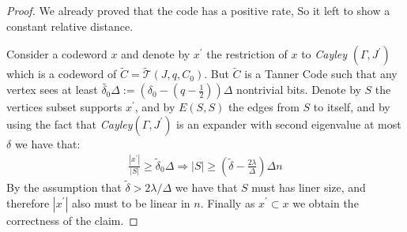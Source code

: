 \begin{proof} We already proved that the code has a positive rate, So it left to show a constant relative distance. 

  Consider a codeword $x$ and denote by $x^{\prime}$ the restriction of $x$ to \emph{Cayley }$\left( \Gamma, J^{\prime}  \right)$ which is a codeword of $\tilde{C} = \tilde{\mathcal{T}}\left(J, q ,C_{0}\right)$. But $\tilde{C}$ is a Tanner Code such that any vertex sees at least $ \tilde{\delta_{0}} \Delta := \left(\delta_{0} - \left( q - \frac{1}{2}   \right) \right)\Delta $ nontrivial bits.
  Denote by $S$ the vertices subset supports $x^{\prime}$, and by $E\left( S,S \right)$ the edges from $S$ to itself, and by using the fact that \emph{Cayley}$\left( \Gamma, J^{\prime} \right)$ is an expander with second eigenvalue at most $\delta$ we have that: 
  \begin{equation*}
    \begin{split}
      \frac{|x^{\prime}|}{|S|} \ge \tilde{\delta}_{0}\Delta \Rightarrow  |S| \ge \left( \tilde{\delta} - \frac{2\lambda}{\Delta}  \right)\Delta n 
    \end{split}
  \end{equation*}
  By the assumption that $\tilde{\delta} > 2\lambda / \Delta $ we have that $S$ must has liner size, and therefore $|x^{\prime}|$ also must to be linear in $n$. Finally as $x^{\prime} \subset x$ we obtain the correctness of the claim.  
\end{proof} 

